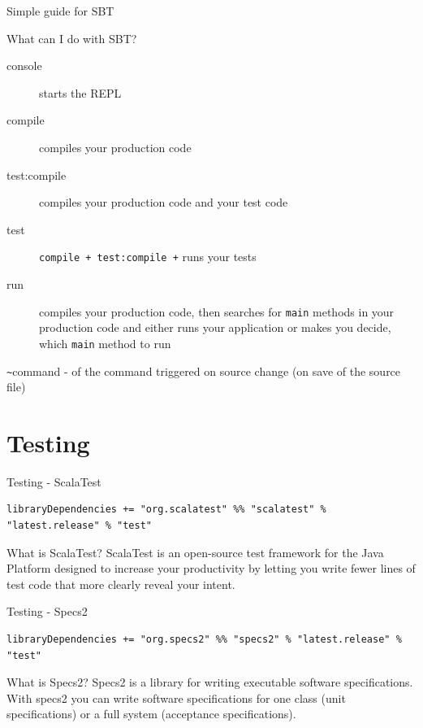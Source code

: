 \begin{frame}[fragile]{Simple guide for SBT}
\begin{block}{What can I do with SBT?}
\begin{description}
\item[console] starts the REPL
\item[compile] compiles your production code
\item[test:compile] compiles your production code and your test code
\item[test] \lstinline!compile + test:compile +! runs your tests
\item[run] compiles your production code, then searches for \lstinline!main!
methods in your production code and either runs your application or makes you
decide, which \lstinline!main! method to run
\end{description}
\end{block}
\pause
\begin{center}
\lstinline!~!command -  of the command
triggered on source change (on save of the source file)
\end{center}
\end{frame}

\section{Testing}
\begin{frame}[fragile]{Testing - ScalaTest}
\begin{center}
\end{center}
\begin{lstlisting}[basicstyle=\scriptsize]
libraryDependencies += "org.scalatest" %% "scalatest" % "latest.release" % "test"
\end{lstlisting}
\begin{block}{What is ScalaTest?}
ScalaTest is an open-source test framework for the Java Platform designed to
increase your productivity by letting you write fewer lines of test code that
more clearly reveal your intent.
\end{block}
\end{frame}
\begin{frame}[fragile]{Testing - Specs2}
\begin{center}
\end{center}
\begin{lstlisting}[basicstyle=\scriptsize]
libraryDependencies += "org.specs2" %% "specs2" % "latest.release" % "test"
\end{lstlisting}
\begin{block}{What is Specs2?}
Specs2 is a library for writing executable software specifications. With specs2
you can write software specifications for one class (unit specifications) or a
full system (acceptance specifications).
\end{block}
\end{frame}

